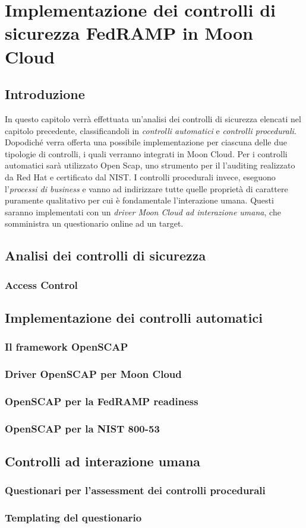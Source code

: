\documentclass[../main.tex]{subfiles}
\begin{document}
\chapter{Implementazione dei controlli di sicurezza FedRAMP in Moon Cloud}
\section{Introduzione}
In questo capitolo verrà effettuata un'analisi dei controlli di sicurezza elencati nel capitolo precedente, classificandoli in \textit{controlli automatici} e \textit{controlli procedurali}. Dopodiché verra offerta una possibile implementazione per ciascuna delle due tipologie di controlli, i quali verranno integrati in Moon Cloud. Per i controlli automatici sarà utilizzato Open Scap, uno strumento per il l'auditing realizzato da Red Hat e certificato dal NIST. I controlli procedurali invece, eseguono l'\textit{processi di business} e vanno ad indirizzare tutte quelle proprietà di carattere puramente qualitativo per cui è fondamentale l'interazione umana.
Questi saranno implementati con un \textit{driver Moon Cloud ad interazione umana}, che somministra un questionario online ad un target.

\section{Analisi dei controlli di sicurezza}
\subsection{Access Control}
\section{Implementazione dei controlli automatici}
\subsection{Il framework OpenSCAP}
\subsection{Driver OpenSCAP per Moon Cloud}
\subsection{OpenSCAP per la FedRAMP readiness}
\subsection{OpenSCAP per la NIST 800-53}
\section{Controlli ad interazione umana}
\subsection{Questionari per l'assessment dei controlli procedurali}
\subsection{Templating del questionario}
\end{document}
